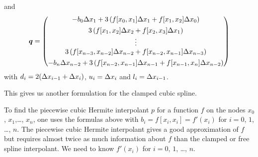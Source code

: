 and
\[
\bm{q} = \begin{pmatrix}
- b_0 \Delta{x_1} + 3 \left( f[x_0,x_1]\Delta{x_1} + f[x_1,x_2]
\Delta{x_0} \right) \\[0.4em]
3 \left( f[x_1,x_2]\Delta{x_2} + f[x_2,x_3] \Delta{x_1} \right) \\
\vdots \\
3 \left( f[x_{n-3},x_{n-2}]\Delta{x_{n-2}}
+ f[x_{n-2},x_{n-1}] \Delta{x_{n-3}} \right) \\[0.4em]
- b_n \Delta{x_{n-2}} + 3 \left( f[x_{n-2},x_{n-1}]\Delta{x_{n-1}}
+ f[x_{n-1},x_n] \Delta{x_{n-2}} \right)
\end{pmatrix}
\]
with $d_i = 2(\Delta{x_{i-1}} + \Delta{x_i})$, $u_i = \Delta{x_i}$ and
$l_i = \Delta{x_{i-1}}$.

This gives us another formulation for the clamped cubic spline.

\begin{rmk}
To find the piecewise cubic Hermite interpolant $p$ for a function $f$
on the nodes $x_0$, $x_1$,\ldots, $x_n$, one uses the formulas above
with $b_i = f[x_i,x_i] = f'(x_i)$ for $i=0$, $1$, \ldots, $n$.  The
piecewise cubic Hermite interpolant gives a good approximation of $f$
but requires almost twice as much information about $f$ than the
clamped or free spline interpolant. We need to know $f'(x_i)$ for
$i=0$, $1$, \ldots, $n$.
\end{rmk}

